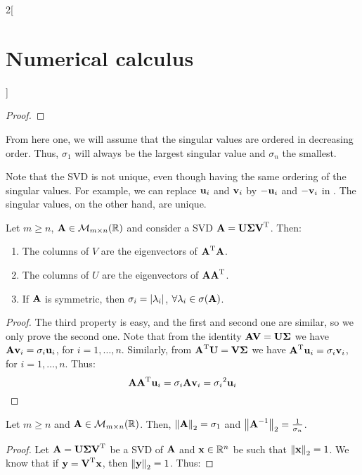 \documentclass[../../../main_math.tex]{subfiles}
\begin{document}
\begin{multicols}{2}[\section{Numerical calculus}]
\begin{proof}
  \end{proof}
  \begin{remark}
    From here one, we will assume that the singular values are ordered in decreasing order. Thus, $\sigma_1$ will always be the largest singular value and $\sigma_n$ the smallest.
  \end{remark}
  \begin{remark}
    Note that the SVD is not unique, even though having the same ordering of the singular values. For example, we can replace $\boldsymbol{\mathrm{u}}_i$ and $\boldsymbol{\mathrm{v}}_i$ by $-\boldsymbol{\mathrm{u}}_i$ and $-\boldsymbol{\mathrm{v}}_i$ in . The singular values, on the other hand, are unique.
  \end{remark}
  \begin{corollary}\label{NC:svd-cor}
    Let $m\geq n$, $\boldsymbol{\mathrm{A}}\in\mathcal{M}_{m\times n}(\mathbb{R})$ and consider a SVD $\boldsymbol{\mathrm{A}}=\boldsymbol{\mathrm{U}}\boldsymbol{\mathrm{\Sigma}}{\boldsymbol{\mathrm{V}}}^{\mathrm{T}}$. Then:
    \begin{enumerate}
      \item The columns of $V$ are the eigenvectors of ${\boldsymbol{\mathrm{A}}}^{\mathrm{T}}\boldsymbol{\mathrm{A}}$.
      \item The columns of $U$ are the eigenvectors of $\boldsymbol{\mathrm{A}}{\boldsymbol{\mathrm{A}}}^{\mathrm{T}}$.
      \item If $\boldsymbol{\mathrm{A}}$ is symmetric, then $\sigma_i=\abs{\lambda_i}$, $\forall\lambda_i\in\sigma(\boldsymbol{\mathrm{A}})$.
    \end{enumerate}
  \end{corollary}
  \begin{proof}
    The third property is easy, and the first and second one are similar, so we only prove the second one. Note that from the identity $\boldsymbol{\mathrm{AV}}=\boldsymbol{\mathrm{U\Sigma}}$ we have $\boldsymbol{\mathrm{A}}\boldsymbol{\mathrm{v}}_i=\sigma_i\boldsymbol{\mathrm{u}}_i$, for $i=1,\ldots,n$. Similarly, from ${\boldsymbol{\mathrm{A}}}^{\mathrm{T}}\boldsymbol{\mathrm{U}}=\boldsymbol{\mathrm{V\Sigma}}$ we have ${\boldsymbol{\mathrm{A}}}^{\mathrm{T}}\boldsymbol{\mathrm{u}}_i=\sigma_i\boldsymbol{\mathrm{v}}_i$, for $i=1,\ldots,n$. Thus:
    $$
      \boldsymbol{\mathrm{A}}{\boldsymbol{\mathrm{A}}}^{\mathrm{T}}\boldsymbol{\mathrm{u}}_i=\sigma_i\boldsymbol{\mathrm{A}}\boldsymbol{\mathrm{v}}_i={\sigma_i}^2\boldsymbol{\mathrm{u}}_i
    $$
  \end{proof}
  \begin{proposition}\label{NC:norm_svd}
    Let $m\geq n$ and $\boldsymbol{\mathrm{A}}\in\mathcal{M}_{m\times n}(\mathbb{R})$. Then, $\left\|\boldsymbol{\mathrm{A}}\right\|_2 = \sigma_1$ and $\left\|\boldsymbol{\mathrm{A}}^{-1}\right\|_2=\frac{1}{\sigma_n}$.
  \end{proposition}
  \begin{proof}
    Let $\boldsymbol{\mathrm{A}}=\boldsymbol{\mathrm{U}}\boldsymbol{\mathrm{\Sigma}}{\boldsymbol{\mathrm{V}}}^{\mathrm{T}}$ be a SVD of $\boldsymbol{\mathrm{A}}$ and $\boldsymbol{\mathrm{x}}\in\mathbb{R}^n$ be such that $\left\|\boldsymbol{\mathrm{x}}\right\|_2=1$. We know that if $\boldsymbol{\mathrm{y}}={\boldsymbol{\mathrm{V}}}^{\mathrm{T}}\boldsymbol{\mathrm{x}}$, then $\left\|\boldsymbol{\mathrm{y}}\right\|_2=1$. Thus:

\end{proof}
\end{multicols}
\end{document}
